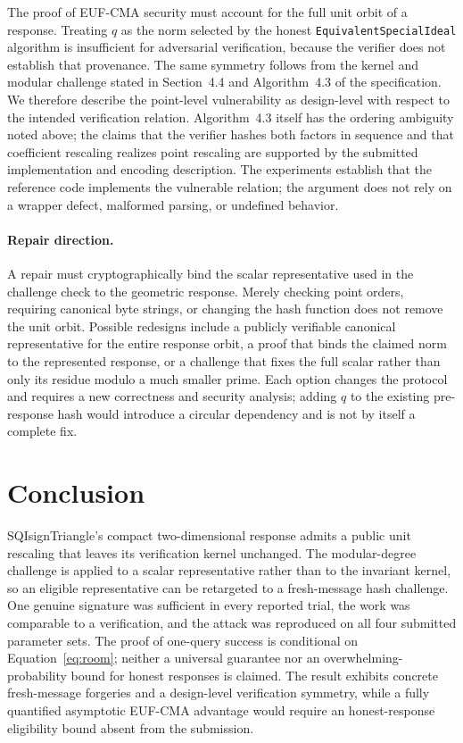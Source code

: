 \documentclass[11pt,a4paper]{article}
\begin{document}
The proof of EUF-CMA security must account for the full unit orbit of a
response. Treating $q$ as the norm selected by the honest
\texttt{EquivalentSpecialIdeal} algorithm is insufficient for adversarial
verification, because the verifier does not establish that provenance. The
same symmetry follows from the kernel and modular challenge stated in
Section~4.4 and Algorithm~4.3 of the specification. We therefore describe the
point-level vulnerability as design-level with respect to the intended
verification relation. Algorithm~4.3 itself has the ordering ambiguity noted
above; the claims that the verifier hashes both factors in sequence and that
coefficient rescaling realizes point rescaling are supported by the submitted
implementation and encoding description. The experiments establish that the
reference code implements the vulnerable relation; the argument does not rely
on a wrapper defect, malformed parsing, or undefined behavior.

\paragraph{Repair direction.}
A repair must cryptographically bind the scalar representative used in the
challenge check to the geometric response. Merely checking point orders,
requiring canonical byte strings, or changing the hash function does not
remove the unit orbit. Possible redesigns include a publicly verifiable
canonical representative for the entire response orbit, a proof that binds
the claimed norm to the represented response, or a challenge that fixes the
full scalar rather than only its residue modulo a much smaller prime. Each
option changes the protocol and requires a new correctness and security
analysis; adding $q$ to the existing pre-response hash would introduce a
circular dependency and is not by itself a complete fix.

\section{Conclusion}

SQIsignTriangle's compact two-dimensional response admits a public unit
rescaling that leaves its verification kernel unchanged. The modular-degree
challenge is applied to a scalar representative rather than to the invariant
kernel, so an eligible representative can be retargeted to a fresh-message
hash challenge. One genuine signature was sufficient in every reported trial,
the work was comparable to a verification, and the attack was reproduced on
all four submitted parameter sets. The proof of one-query success is
conditional on Equation~\eqref{eq:room}; neither a universal guarantee nor an
overwhelming-probability bound for honest responses is claimed. The result
exhibits concrete fresh-message forgeries and a design-level verification
symmetry, while a fully quantified asymptotic EUF-CMA advantage would require
an honest-response eligibility bound absent from the submission.
\end{document}
